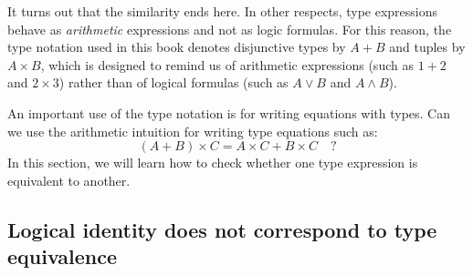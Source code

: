 It turns out that the similarity ends here. In other respects, type
expressions behave as \emph{arithmetic} expressions and not as logic
formulas. For this reason, the type notation used in this book denotes
disjunctive types by $A+B$ and tuples by $A\times B$, which is designed
to remind us of arithmetic expressions (such as $1+2$ and $2\times3$)
rather than of logical formulas (such as $A\vee B$ and $A\wedge B$). 

An important use of the type notation is for writing equations with
types. Can we use the arithmetic intuition for writing type equations
such as:
\begin{equation}
\left(A+B\right)\times C=A\times C+B\times C\quad?\label{eq:ch-example-distributive}
\end{equation}
In this section, we will learn how to check whether one type expression
is equivalent to another.

\subsection{Logical identity does not correspond to type equivalence\label{subsec:Logical-identity-not-type-equivalence}}

